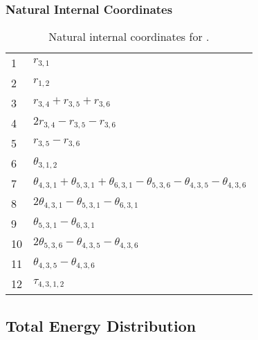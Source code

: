 \documentclass[10pt,oneside]{article}
\begin{document}
\begin{table}[h!]
\subsubsection*{Natural Internal Coordinates}
\centering
\caption{Natural internal coordinates for .}
\small
\begin{tabular}{ll}
\toprule
  1   & $r_{3,1}$ \\
  2   & $r_{1,2}$ \\
  3   & $r_{3,4} + r_{3,5} + r_{3,6}$ \\
  4   & $2r_{3,4} - r_{3,5} - r_{3,6}$ \\
  5   & $r_{3,5} - r_{3,6}$ \\
  6   & $\theta_{3,1,2}$ \\
  7   & $\theta_{4,3,1} + \theta_{5,3,1} + \theta_{6,3,1} - \theta_{5,3,6} - \theta_{4,3,5} - \theta_{4,3,6}$ \\
  8   & $2\theta_{4,3,1} - \theta_{5,3,1} - \theta_{6,3,1}$ \\
  9   & $\theta_{5,3,1} - \theta_{6,3,1}$ \\
  10  & $2\theta_{5,3,6} - \theta_{4,3,5} - \theta_{4,3,6}$ \\
  11  & $\theta_{4,3,5} - \theta_{4,3,6}$ \\
  12  & $\tau_{4,3,1,2}$ \\
\bottomrule
\end{tabular}
\end{table}

\begin{table}
\subsection*{Total Energy Distribution}
\centering\end{table}

\clearpage

\subsection{}
\end{document}
